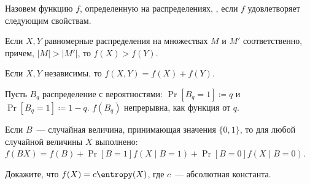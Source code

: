 Назовем функцию $f$, определенную на распределениях, , если $f$
удовлетворяет следующим свойствам.
\begin{enumtask}
    \item Если $X, Y$ равномерные распределения на множествах $M$ и $M'$ соответственно, причем, $|M| >
        |M'|$, то $f(X) > f(Y)$.
    \item Если $X, Y$ независимы, то $f(X, Y) = f(X) + f(Y)$.
    \item Пусть $B_q$ распределение с вероятностями: $\Pr[B_q = 1] \coloneqq q$ и $\Pr[B_q = 1] \coloneqq
        1 - q$. $f(B_q)$ непрерывна, как функция от $q$.
    \item Если $B$~--- случайная величина, принимающая значения $\{0, 1\}$, то для любой случайной
        величины $X$ выполнено: $f(BX) = f(B) + \Pr[B = 1] f(X \mid B = 1) + \Pr[B = 0] f(X \mid B = 0)$.
\end{enumtask}

Докажите, что $f(X) = c \entropy(X)$, где $c$~--- абсолютная константа.
